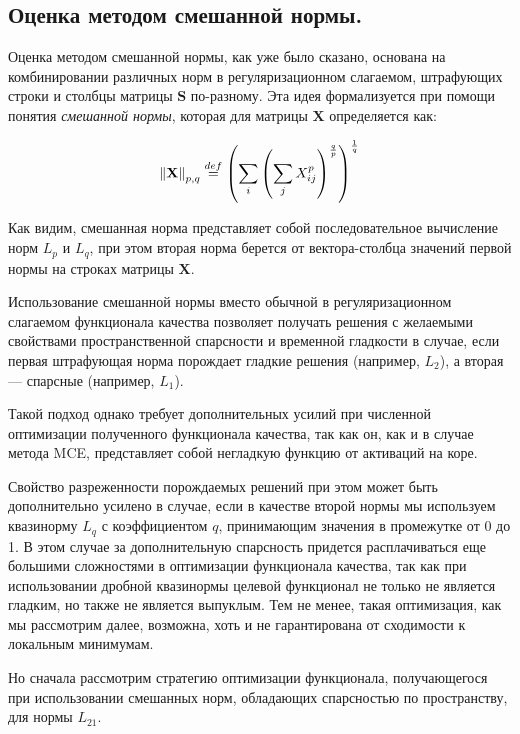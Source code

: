 \subsection{Оценка методом смешанной нормы.}
\label{section_mixed_norm}

Оценка методом смешанной нормы, как уже было сказано, основана на
комбинировании различных норм в регуляризационном слагаемом, штрафующих строки
и столбцы матрицы $\mathbf{S}$ по-разному.  Эта идея формализуется при помощи понятия
\emph{смешанной нормы}, которая для матрицы $\mathbf{X}$ определяется как:

\begin{equation}
    \left\lVert\mathbf{X}\right\rVert_{p,q} \stackrel{def}{=}
    \left(\sum_i \left( \sum_j X_{ij}^p \right)^{\frac{q}{p}}\right)^{\frac{1}{q}}
    \label{mixed_norm_def}
\end{equation}

Как видим, смешанная норма представляет собой последовательное вычисление
норм $L_p$ и $L_q$, при этом вторая норма берется от вектора-столбца значений первой
нормы на строках матрицы $\mathbf{X}$.

Использование смешанной нормы вместо обычной в регуляризационном слагаемом
функционала качества позволяет получать решения с желаемыми свойствами
пространственной спарсности и временной гладкости в случае, если первая штрафующая норма
порождает гладкие решения (например, $L_2$), а вторая --- спарсные (например, $L_1$).

Такой подход однако требует дополнительных усилий при численной оптимизации
полученного функционала качества, так как он, как и в случае метода MCE,
представляет собой негладкую функцию от активаций на коре.

Свойство разреженности порождаемых решений при этом может быть дополнительно
усилено в случае, если в качестве второй нормы мы используем квазинорму $L_q$ с
коэффициентом $q$, принимающим значения в промежутке от 0 до 1. В этом случае
за дополнительную спарсность придется расплачиваться еще большими сложностями в
оптимизации функционала качества, так как при использовании дробной квазинормы
целевой функционал не только не является гладким, но также не является
выпуклым. Тем не менее, такая оптимизация, как мы рассмотрим далее, возможна,
хоть и не гарантирована от сходимости к локальным минимумам.

Но сначала рассмотрим стратегию оптимизации функционала, получающегося при
использовании смешанных норм, обладающих спарсностью по пространству, для нормы
$L_{21}$.

